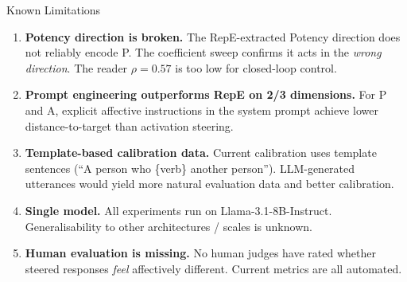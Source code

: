 \documentclass[aspectratio=169,11pt]{beamer}
\begin{document}
\begin{frame}{Known Limitations}

\begin{enumerate}
    \item \textbf{Potency direction is broken.}
    The RepE-extracted Potency direction does not reliably encode P.
    The coefficient sweep confirms it acts in the \emph{wrong direction}.
    The reader $\rho = 0.57$ is too low for closed-loop control.

    \item \textbf{Prompt engineering outperforms RepE on 2/3 dimensions.}
    For P and A, explicit affective instructions in the system prompt
    achieve lower distance-to-target than activation steering.

    \item \textbf{Template-based calibration data.}
    Current calibration uses template sentences (``A person who \{verb\}
    another person''). LLM-generated utterances would yield more natural
    evaluation data and better calibration.

    \item \textbf{Single model.}
    All experiments run on Llama-3.1-8B-Instruct. Generalisability to
    other architectures / scales is unknown.

    \item \textbf{Human evaluation is missing.}
    No human judges have rated whether steered responses \emph{feel}
    affectively different. Current metrics are all automated.
\end{enumerate}
\end{frame}

\end{document}
